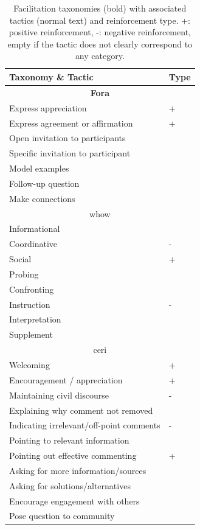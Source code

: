 \documentclass[11pt]{article}
\theoremstyle{definition}
\theoremstyle{plain}
\begin{document}
\begin{table}[t]
	\centering
	\small
	\begin{tabular}{ll}
		\toprule
		\textbf{Taxonomy \& Tactic} & \textbf{Type} \\
		\midrule
		\multicolumn{2}{c}{\textbf{Fora}} \\
		\midrule
		Express appreciation & + \\
		Express agreement or affirmation & + \\
		Open invitation to participants &   \\
		Specific invitation to participant &   \\
		Model examples &   \\
		Follow-up question &   \\
		Make connections &   \\
		
		\midrule
		\multicolumn{2}{c}{\ac{whow}} \\
		\midrule
		Informational &   \\
		Coordinative & - \\
		Social & + \\
		Probing &   \\
		Confronting &   \\
		Instruction & - \\
		Interpretation &   \\
		Supplement &   \\
		
		\midrule
		\multicolumn{2}{c}{\ac{ceri}} \\
		\midrule
		Welcoming & + \\
		Encouragement / appreciation & + \\
		Maintaining civil discourse & - \\
		Explaining why comment not removed &   \\
		Indicating irrelevant/off-point comments & - \\
		Pointing to relevant information &   \\
		Pointing out effective commenting & + \\
		Asking for more information/sources &   \\
		Asking for solutions/alternatives &   \\
		Encourage engagement with others &   \\
		Pose question to community &   \\
		
		\bottomrule
	\end{tabular}
	\caption{Facilitation taxonomies (bold) with associated tactics (normal text) and reinforcement type. +: positive reinforcement, -: negative reinforcement, empty if the tactic does not clearly correspond to any category.}
\end{table}
\end{document}
